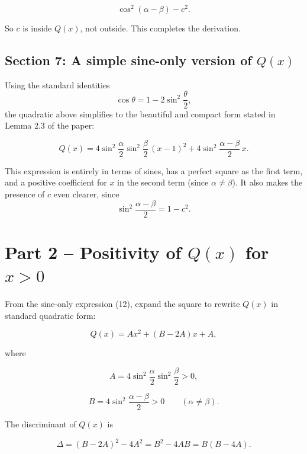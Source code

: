 \documentclass{article}
\begin{document}
\[
\cos^{2}(\alpha-\beta)-c^{2}.
\]

So \(c\) is inside \(Q(x)\), not outside. This completes the derivation.

\subsection*{Section 7: A simple sine-only version of \(Q(x)\)}

Using the standard identities
\[
\cos\theta = 1 - 2\sin^2\frac{\theta}{2},
\]
the quadratic above simplifies to the beautiful and compact form stated in Lemma 2.3 of the paper:

\begin{equation}
\boxed{
Q(x)=
4\sin^{2}\frac{\alpha}{2}\sin^{2}\frac{\beta}{2}\,(x-1)^2
+
4\sin^{2}\frac{\alpha-\beta}{2}\,x.
}
\tag{12}
\end{equation}

This expression is entirely in terms of sines, has a perfect square as the first term, and a positive coefficient for \(x\) in the second term (since \(\alpha \neq \beta\)). It also makes the presence of \(c\) even clearer, since
\[
\sin^{2}\frac{\alpha-\beta}{2}=1-c^{2}.
\]

\bigskip

\section*{Part 2 -- Positivity of \(Q(x)\) for \(x>0\)}

From the sine-only expression (12), expand the square to rewrite \(Q(x)\) in standard quadratic form:

\begin{equation}
Q(x) = A x^{2} + (B-2A)x + A,
\tag{13}
\end{equation}

where

\begin{equation}
A = 4\sin^{2}\frac{\alpha}{2}\sin^{2}\frac{\beta}{2} > 0,
\tag{14}
\end{equation}

\begin{equation}
B = 4\sin^{2}\frac{\alpha-\beta}{2} > 0
\qquad (\alpha \neq \beta).
\tag{15}
\end{equation}

The discriminant of \(Q(x)\) is

\begin{equation}
\Delta = (B-2A)^2 - 4A^2 = B^2 - 4AB = B(B-4A).
\tag{16}
\end{equation}
\end{document}
